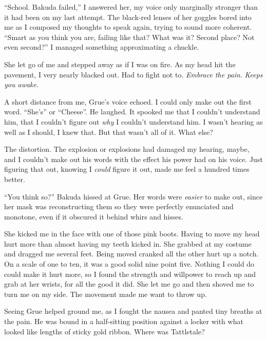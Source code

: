 ``School.  Bakuda failed,'' I answered her, my voice only marginally stronger than it had been on my last attempt.  The black-red lenses of her goggles bored into me as I composed my thoughts to speak again, trying to sound more coherent. ``Smart as you think you are, failing like that?  What was it?  Second place?  Not even second?''  I managed something approximating a chuckle.



She let go of me and stepped away as if I was on fire.  As my head hit the pavement, I very nearly blacked out.  Had to fight not to.  \emph{Embrace the pain}.  \emph{Keeps you awake.}



A short distance from me, Grue's voice echoed.  I could only make out the first word.  ``She's'' or ``Cheese''.  He laughed.  It spooked me that I couldn't understand him, that I couldn't figure out \emph{why} I couldn't understand him.  I wasn't hearing as well as I should, I knew that.  But that wasn't all of it.  What else?



The distortion.  The explosion or explosions had damaged my hearing, maybe, and I couldn't make out his words with the effect his power had on his voice.  Just figuring that out, knowing I \emph{could} figure it out, made me feel a hundred times better.



``You think so?'' Bakuda hissed at Grue.  Her words were \emph{easier} to make out, since her mask was reconstructing them so they were perfectly enunciated and monotone, even if it obscured it behind whirs and hisses.



She kicked me in the face with one of those pink boots.  Having to move my head hurt more than almost having my teeth kicked in.  She grabbed at my costume and dragged me several feet.  Being moved cranked all the other hurt up a notch.  On a scale of one to ten, it was a good solid nine point five.  Nothing I could do could make it hurt more, so I found the strength and willpower to reach up and grab at her wrists, for all the good it did.  She let me go and then shoved me to turn me on my side.  The movement made me want to throw up.



Seeing Grue helped ground me, as I fought the nausea and panted tiny breaths at the pain.  He was bound in a half-sitting position against a locker with what looked like lengths of sticky gold ribbon.  Where was Tattletale?



